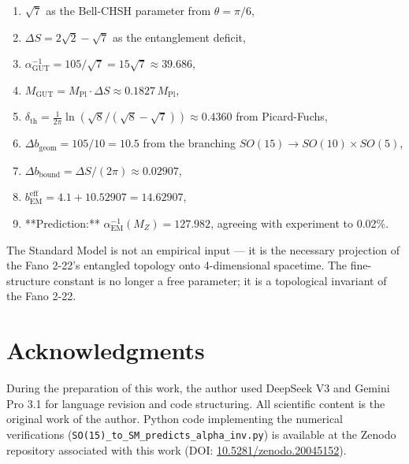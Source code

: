 \documentclass[12pt]{article}
\begin{document}
\begin{enumerate}
  \item \(\sqrt{7}\) as the Bell-CHSH parameter from \(\theta = \pi/6\),
  \item \(\Delta S = 2\sqrt{2} - \sqrt{7}\) as the entanglement deficit,
  \item \(\alpha_{\text{GUT}}^{-1} = 105 / \sqrt{7} = 15\sqrt{7} \approx 39.686\),
  \item \(M_{\text{GUT}} = M_{\text{Pl}} \cdot \Delta S \approx 0.1827\,M_{\text{Pl}}\),
  \item \(\delta_{\text{th}} = \frac{1}{2\pi}\ln(\sqrt{8}/(\sqrt{8}-\sqrt{7})) \approx 0.4360\) from Picard-Fuchs,
  \item \(\Delta b_{\text{geom}} = 105/10 = 10.5\) from the branching \(SO(15) \to SO(10) \times SO(5)\),
  \item \(\Delta b_{\text{bound}} = \Delta S/(2\pi) \approx 0.02907\),
  \item \(b_{\text{EM}}^{\text{eff}} = 4.1 + 10.52907 = 14.62907\),
  \item **Prediction:** \(\alpha_{\text{EM}}^{-1}(M_Z) = 127.982\), agreeing with experiment to 0.02\%.
\end{enumerate}

The Standard Model is not an empirical input — it is the necessary projection of the Fano 2-22's entangled topology onto 4-dimensional spacetime. The fine-structure constant is no longer a free parameter; it is a topological invariant of the Fano 2-22.

\section*{Acknowledgments}

{\raggedright
During the preparation of this work, the author used DeepSeek V3 and Gemini Pro 3.1 for language revision and code structuring. All scientific content is the original work of the author. Python code implementing the numerical verifications (\texttt{SO(15)\_to\_SM\_predicts\_alpha\_inv.py}) is available at the Zenodo repository associated with this work (DOI: \href{https://doi.org/10.5281/zenodo.20045152}{10.5281/zenodo.20045152}).
\par}
\end{document}

